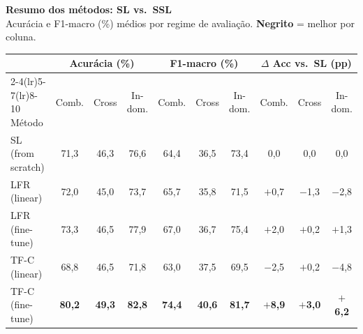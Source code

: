 \documentclass[border=8pt,varwidth=\maxdimen]{standalone}
\begin{document}
\centering
{\large\bfseries Resumo dos métodos: SL vs.\ SSL}\\[2pt]
{\small Acurácia e F1-macro (\%) médios por regime de avaliação. \textbf{Negrito} = melhor por coluna.}\\[6pt]
\begin{tabular}{lccccccccc}
\toprule
& \multicolumn{3}{c}{Acurácia (\%)} & \multicolumn{3}{c}{F1-macro (\%)} & \multicolumn{3}{c}{$\Delta$ Acc vs.\ SL (pp)}\\
\cmidrule(lr){2-4}\cmidrule(lr){5-7}\cmidrule(lr){8-10}
Método & Comb. & Cross & In-dom. & Comb. & Cross & In-dom. & Comb. & Cross & In-dom.\\
\midrule
SL (from scratch) & 71{,}3 & 46{,}3 & 76{,}6 & 64{,}4 & 36{,}5 & 73{,}4 & 0{,}0 & 0{,}0 & 0{,}0\\
LFR (linear)      & 72{,}0 & 45{,}0 & 73{,}7 & 65{,}7 & 35{,}8 & 71{,}5 & $+$0{,}7 & $-$1{,}3 & $-$2{,}8\\
LFR (fine-tune)   & 73{,}3 & 46{,}5 & 77{,}9 & 67{,}0 & 36{,}7 & 75{,}4 & $+$2{,}0 & $+$0{,}2 & $+$1{,}3\\
TF-C (linear)     & 68{,}8 & 46{,}5 & 71{,}8 & 63{,}0 & 37{,}5 & 69{,}5 & $-$2{,}5 & $+$0{,}2 & $-$4{,}8\\
TF-C (fine-tune)  & \textbf{80{,}2} & \textbf{49{,}3} & \textbf{82{,}8} & \textbf{74{,}4} & \textbf{40{,}6} & \textbf{81{,}7} & \textbf{$+$8{,}9} & \textbf{$+$3{,}0} & \textbf{$+$6{,}2}\\
\bottomrule
\end{tabular}
\end{document}
